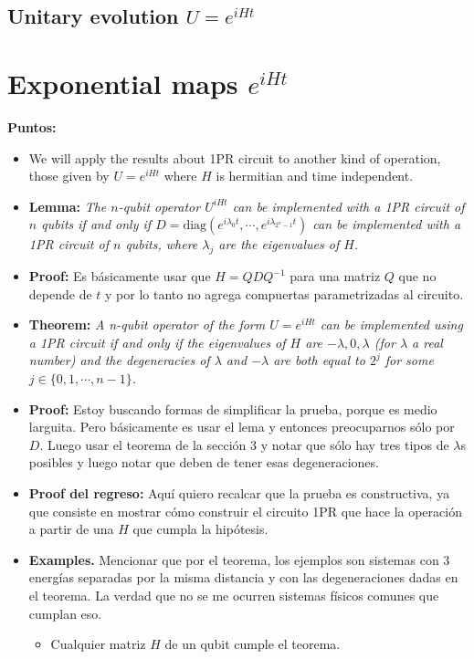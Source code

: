 \newpage
\subsection{Unitary evolution $U = e^{iHt}$}
\section{Exponential maps $e^{iHt}$} %
\label{sec: Exponential maps}
\textbf{Puntos:}
\begin{itemize}
\item We will apply the results about 1PR circuit to another kind of operation, those given by $U  = e^{iHt}$ where $H$ is hermitian  and time independent.
\item \textbf{Lemma:}\textit{ The $n$-qubit operator $U^{iHt}$ can be implemented with a 1PR circuit of $n$ qubits if and only if $D = \text{diag}(e^{i\lambda_0 t}, \cdots, e^{i \lambda_{2^n-1}t})$ can be implemented with a 1PR circuit of $n$ qubits, where $\lambda_j$ are the eigenvalues of $H$.}
\item \textbf{Proof:}  Es b\'asicamente usar que $H = QDQ^{-1}$ para una matriz $Q$ que no depende de $t$ y por lo tanto no agrega compuertas parametrizadas al circuito. 
\item \textbf{Theorem:} \textit{ A n-qubit operator of the form $U = e^{iHt}$ can be implemented using a 1PR circuit if and only if the eigenvalues of $H$ are $-\lambda,0,\lambda$ (for $\lambda$ a real number) and the degeneracies of $\lambda$ and $-\lambda$ are both equal to $2^j$ for some $j\in \{0,1,\cdots,n-1\}$.}
\item \textbf{Proof:} Estoy buscando formas de simplificar la prueba, porque es medio larguita. Pero básicamente es usar el lema y entonces preocuparnos sólo por $D$. Luego  usar el teorema de la sección 3 y notar que sólo hay tres tipos de  $\lambda$s posibles y luego notar que deben de tener esas degeneraciones.
\item \textbf{Proof del regreso:} Aquí quiero recalcar que la prueba es constructiva, ya que consiste en mostrar cómo construir el circuito 1PR que hace la operación a partir de una $H$ que cumpla la hipótesis. 
\item \textbf{Examples.} Mencionar que por el teorema, los ejemplos son sistemas con 3 energías separadas por la misma distancia y con las degeneraciones dadas en el teorema. 
La verdad que no se me ocurren sistemas físicos comunes que cumplan eso.
\begin{itemize}
\item Cualquier matriz $H$ de un qubit cumple el teorema.

\end{itemize}
\end{itemize}

